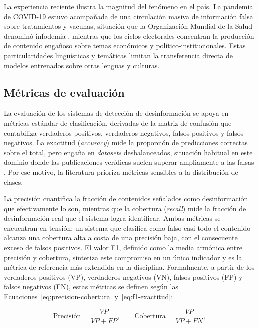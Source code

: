 La experiencia reciente ilustra la magnitud del fenómeno en el país. La pandemia de COVID-19 estuvo acompañada de una circulación masiva de información falsa sobre tratamientos y vacunas, situación que la Organización Mundial de la Salud denominó infodemia \parencite{Zarocostas2020}, mientras que los ciclos electorales concentran la producción de contenido engañoso sobre temas económicos y político-institucionales. Estas particularidades lingüísticas y temáticas limitan la transferencia directa de modelos entrenados sobre otras lenguas y culturas.

\subsection{Métricas de evaluación}

La evaluación de los sistemas de detección de desinformación se apoya en métricas estándar de clasificación, derivadas de la matriz de confusión que contabiliza verdaderos positivos, verdaderos negativos, falsos positivos y falsos negativos. La exactitud (\textit{accuracy}) mide la proporción de predicciones correctas sobre el total, pero engaña en \textit{datasets} desbalanceados, situación habitual en este dominio donde las publicaciones verídicas suelen superar ampliamente a las falsas \parencite{GuoEtAl2022}. Por ese motivo, la literatura prioriza métricas sensibles a la distribución de clases.

La precisión cuantifica la fracción de contenidos señalados como desinformación que efectivamente lo son, mientras que la cobertura (\textit{recall}) mide la fracción de desinformación real que el sistema logra identificar. Ambas métricas se encuentran en tensión: un sistema que clasifica como falso casi todo el contenido alcanza una cobertura alta a costa de una precisión baja, con el consecuente exceso de falsos positivos. El valor F1, definido como la media armónica entre precisión y cobertura, sintetiza este compromiso en un único indicador y es la métrica de referencia más extendida en la disciplina. Formalmente, a partir de los verdaderos positivos (VP), verdaderos negativos (VN), falsos positivos (FP) y falsos negativos (FN), estas métricas se definen según las Ecuaciones~\ref{eq:precision-cobertura} y~\ref{eq:f1-exactitud}:

\begin{equation}
  \text{Precisión} = \frac{VP}{VP + FP}, \qquad
  \text{Cobertura} = \frac{VP}{VP + FN},
  \label{eq:precision-cobertura}
\end{equation}

